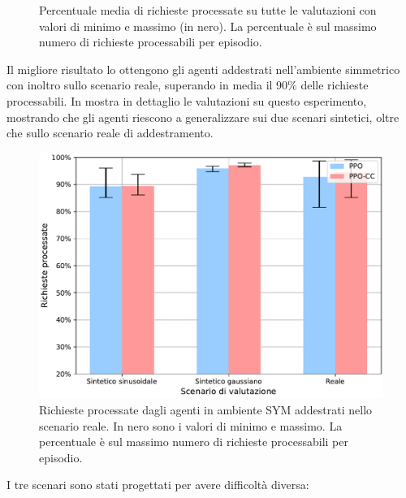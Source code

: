 \begin{figure}
    \caption[Media delle richieste processate nelle valutazioni (percentuale)]{Percentuale media di richieste processate su tutte le valutazioni con valori di minimo e massimo (in nero). La percentuale è sul massimo numero di richieste processabili per episodio.}
    \label{fig:5_results_requests}
\end{figure}

Il migliore risultato lo ottengono gli agenti addestrati nell'ambiente simmetrico con inoltro sullo scenario reale, superando in media il 90\% delle richieste processabili. In  mostra in dettaglio le valutazioni su questo esperimento, mostrando che gli agenti riescono a generalizzare sui due scenari sintetici, oltre che sullo scenario reale di addestramento.

\begin{figure}
    \centering
    \includegraphics[width=.6\linewidth]{assets/5/results/eval_SYM_train_real_processed_requests.pdf}
    \caption[Richieste processate dagli agenti in ambiente SYM addestrati nello scenario reale]{Richieste processate dagli agenti in ambiente SYM addestrati nello scenario reale. In nero sono i valori di minimo e massimo. La percentuale è sul massimo numero di richieste processabili per episodio.}
    \label{fig:5_eval_sym_train_real_requests}
\end{figure}

I tre scenari sono stati progettati per avere difficoltà diversa:

